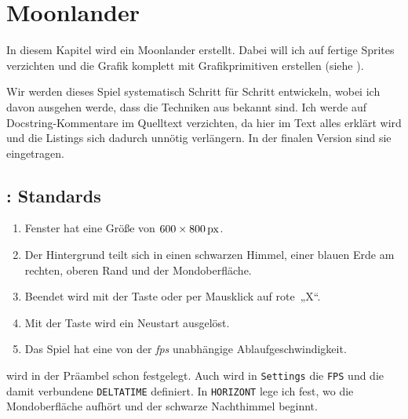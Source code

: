 \newpage
\section{Moonlander}

In diesem Kapitel wird ein Moonlander erstellt. Dabei will ich auf fertige Sprites verzichten und die Grafik komplett mit Grafikprimitiven erstellen (siehe ).

Wir werden dieses Spiel systematisch Schritt für Schritt entwickeln, wobei ich davon ausgehen werde, dass die Techniken aus  bekannt sind. Ich werde auf Docstring-Kommentare im Quelltext verzichten, da hier im Text alles erklärt wird und die Listings sich dadurch unnötig verlängern. In der finalen Version sind sie eingetragen.

\subsection{: Standards}

\begin{enumerate}
    \item Fenster hat eine Größe von $600\times \unit[800]{px}$.\label{reqMoonStandardGröße}
    \item Der Hintergrund teilt sich in einen schwarzen Himmel, einer blauen Erde am rechten, oberen Rand und der Mondoberfläche.\label{reqMoonStandardHintergrund}
    \item Beendet wird mit der Taste \keys{\esc} oder per Mausklick auf rote~„X“.\label{reqMoonStandardBeenden}
    \item Mit der Taste  wird ein Neustart ausgelöst.
    \item Das Spiel hat eine von der \emph{fps} unabhängige Ablaufgeschwindigkeit.\label{reqMoonStandardFps}
\end{enumerate}
\er


 wird in der Präambel schon festgelegt. Auch wird in \texttt{Settings} die \texttt{FPS} und die damit verbundene \texttt{DELTATIME} definiert. In \texttt{HORIZONT} lege ich fest, wo die Mondoberfläche aufhört und der schwarze Nachthimmel beginnt.



